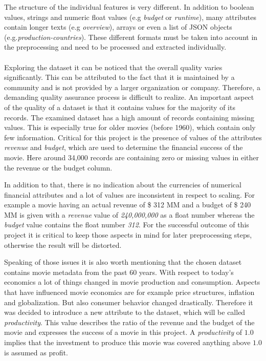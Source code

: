 The structure of the individual features is very different. In addition to boolean values, strings and numeric float values (e.g \textit{budget} or \textit{runtime}), many attributes contain longer texts (e.g \textit{overview}), arrays or even a list of JSON objects (e.g.\textit{production-countries}). These different formats must be taken into account in the preprocessing and need to be processed and extracted individually.
\\\\
Exploring the dataset it can be noticed that the overall quality varies significantly. This can be attributed to the fact that it is maintained by a community and is not provided by a larger organization or company. Therefore, a demanding quality assurance process is difficult to realize. An important aspect of the quality of a dataset is that it contains values for the majority of its records. The examined dataset has a high amount of records containing missing values. This is especially true for older movies (before 1960), which contain only few information. Critical for this project is the presence of values of the attributes \textit{revenue} and \textit{budget}, which are used to determine the financial success of the movie. Here around 34,000 records are containing zero or missing values in either the revenue or the budget column.

In addition to that, there is no indication about the currencies of numerical financial attributes and a lot of values are inconsistent in respect to scaling. For example a movie having an actual revenue of \$ 312 MM and a budget of \$ 240 MM is given with a \textit{revenue} value of \textit{240,000,000} as a float number whereas the \textit{budget} value contains the float number \textit{312}. For the successful outcome of this project it is critical to keep those aspects in mind for later preprocessing steps, otherwise the result will be distorted.

Speaking of those issues it is also worth mentioning that the chosen dataset contains movie metadata from the past 60 years. With respect to today's economics a lot of things changed in movie production and consumption. Aspects that have influenced movie economics are for example price structures, inflation and globalization. But also consumer behavior changed drastically. Therefore it was decided to introduce a new attribute to the dataset, which will be called \textit{productivity}. This value describes the ratio of the revenue and the budget of the movie and expresses the success of a movie in this project. A \textit{productivity} of $1.0$ implies that the investment to produce this movie was covered anything above $1.0$ is assumed as profit.
\\

